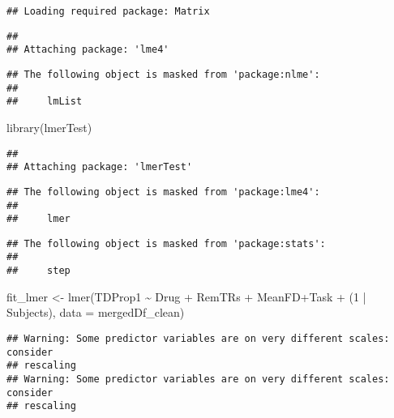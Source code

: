 \documentclass[
]{article}
\newenvironment{Shaded}{\begin{snugshade}}{\end{snugshade}}
\newcommand{\AttributeTok}[1]{\textcolor[rgb]{0.77,0.63,0.00}{#1}}
\newcommand{\DecValTok}[1]{\textcolor[rgb]{0.00,0.00,0.81}{#1}}
\newcommand{\FunctionTok}[1]{\textcolor[rgb]{0.00,0.00,0.00}{#1}}
\newcommand{\NormalTok}[1]{#1}
\newcommand{\OtherTok}[1]{\textcolor[rgb]{0.56,0.35,0.01}{#1}}
\newcommand{\SpecialCharTok}[1]{\textcolor[rgb]{0.00,0.00,0.00}{#1}}
\begin{document}
\begin{verbatim}
## Loading required package: Matrix
\end{verbatim}

\begin{verbatim}
## 
## Attaching package: 'lme4'
\end{verbatim}

\begin{verbatim}
## The following object is masked from 'package:nlme':
## 
##     lmList
\end{verbatim}

\begin{Shaded}
\begin{Highlighting}[]
\FunctionTok{library}\NormalTok{(lmerTest)}
\end{Highlighting}
\end{Shaded}

\begin{verbatim}
## 
## Attaching package: 'lmerTest'
\end{verbatim}

\begin{verbatim}
## The following object is masked from 'package:lme4':
## 
##     lmer
\end{verbatim}

\begin{verbatim}
## The following object is masked from 'package:stats':
## 
##     step
\end{verbatim}

\begin{Shaded}
\begin{Highlighting}[]
\NormalTok{fit\_lmer }\OtherTok{\textless{}{-}} \FunctionTok{lmer}\NormalTok{(TDProp1 }\SpecialCharTok{\textasciitilde{}}\NormalTok{ Drug }\SpecialCharTok{+}\NormalTok{ RemTRs }\SpecialCharTok{+}\NormalTok{ MeanFD}\SpecialCharTok{+}\NormalTok{Task }\SpecialCharTok{+}\NormalTok{ (}\DecValTok{1} \SpecialCharTok{|}\NormalTok{ Subjects), }\AttributeTok{data =}\NormalTok{ mergedDf\_clean)}
\end{Highlighting}
\end{Shaded}

\begin{verbatim}
## Warning: Some predictor variables are on very different scales: consider
## rescaling
## Warning: Some predictor variables are on very different scales: consider
## rescaling
\end{verbatim}
\end{document}
